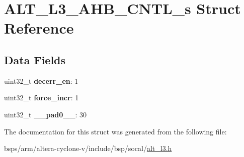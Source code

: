 \hypertarget{structALT__L3__AHB__CNTL__s}{}\section{A\+L\+T\+\_\+\+L3\+\_\+\+A\+H\+B\+\_\+\+C\+N\+T\+L\+\_\+s Struct Reference}
\label{structALT__L3__AHB__CNTL__s}
\subsection*{Data Fields}
\begin{DoxyCompactItemize}
\item 
\mbox{\label{structALT__L3__AHB__CNTL__s_a263c0930e10ca39061d944c2e24a1c2c}} 
uint32\+\_\+t {\bfseries decerr\+\_\+en}\+: 1
\item 
\mbox{\label{structALT__L3__AHB__CNTL__s_a00b75a4304391c19a24daaaff0e0e70f}} 
uint32\+\_\+t {\bfseries force\+\_\+incr}\+: 1
\item 
\mbox{\label{structALT__L3__AHB__CNTL__s_a332f2f1c300590458491b46d75fd1538}} 
uint32\+\_\+t {\bfseries \+\_\+\+\_\+pad0\+\_\+\+\_\+}\+: 30
\end{DoxyCompactItemize}


The documentation for this struct was generated from the following file\+:\begin{DoxyCompactItemize}
\item 
bsps/arm/altera-\/cyclone-\/v/include/bsp/socal/\mbox{\hyperlink{alt__l3_8h}{alt\+\_\+l3.\+h}}\end{DoxyCompactItemize}
